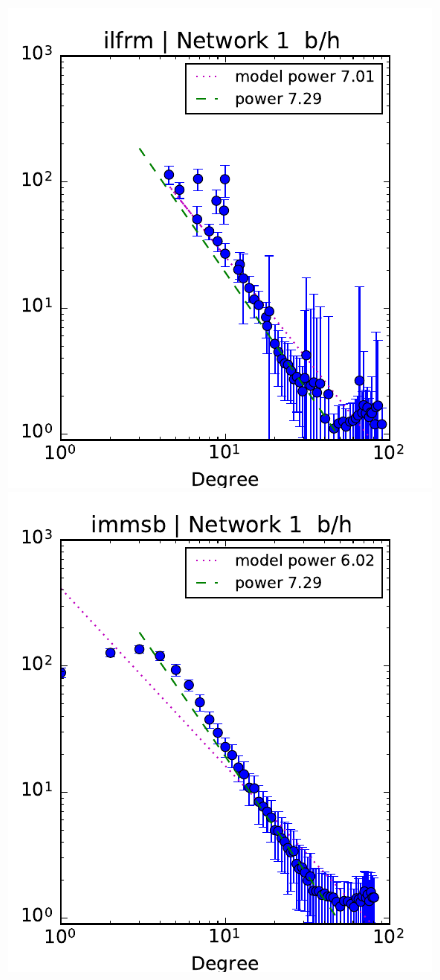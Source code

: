\begin{figure}[h]
	\centering
	
	\includegraphics[scale=0.4]{img/ilfrm_g1_d}
	\endminipage
	\includegraphics[scale=0.4]{img/immsb_g1_d}

\end{figure}
